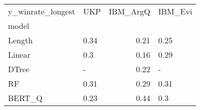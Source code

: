 \begin{tabular}{llrl}
\toprule
y\_winrate\_longest &   UKP &  IBM\_ArgQ & IBM\_Evi \\
model  &       &           &         \\
\midrule
Length &  0.34 &      0.21 &    0.25 \\
Linear &   0.3 &      0.16 &    0.29 \\
DTree  &     - &      0.22 &       - \\
RF     &  0.31 &      0.29 &    0.31 \\
BERT\_Q &  0.23 &      0.44 &     0.3 \\
\bottomrule
\end{tabular}
